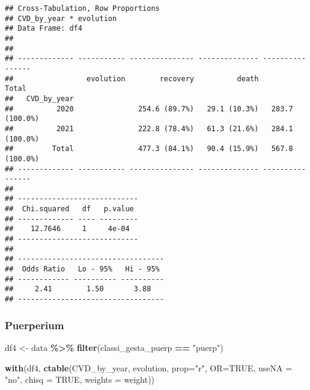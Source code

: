 \documentclass[
]{article}
\newenvironment{Shaded}{\begin{snugshade}}{\end{snugshade}}
\newcommand{\AttributeTok}[1]{\textcolor[rgb]{0.13,0.29,0.53}{#1}}
\newcommand{\ConstantTok}[1]{\textcolor[rgb]{0.56,0.35,0.01}{#1}}
\newcommand{\FunctionTok}[1]{\textcolor[rgb]{0.13,0.29,0.53}{\textbf{#1}}}
\newcommand{\NormalTok}[1]{#1}
\newcommand{\OtherTok}[1]{\textcolor[rgb]{0.56,0.35,0.01}{#1}}
\newcommand{\SpecialCharTok}[1]{\textcolor[rgb]{0.81,0.36,0.00}{\textbf{#1}}}
\newcommand{\StringTok}[1]{\textcolor[rgb]{0.31,0.60,0.02}{#1}}
\begin{document}
\begin{verbatim}
## Cross-Tabulation, Row Proportions  
## CVD_by_year * evolution  
## Data Frame: df4  
## 
## 
## ------------- ----------- --------------- -------------- ----------------
##                 evolution        recovery          death            Total
##   CVD_by_year                                                            
##          2020               254.6 (89.7%)   29.1 (10.3%)   283.7 (100.0%)
##          2021               222.8 (78.4%)   61.3 (21.6%)   284.1 (100.0%)
##         Total               477.3 (84.1%)   90.4 (15.9%)   567.8 (100.0%)
## ------------- ----------- --------------- -------------- ----------------
## 
## ----------------------------
##  Chi.squared   df   p.value 
## ------------- ---- ---------
##    12.7646     1     4e-04  
## ----------------------------
## 
## ----------------------------------
##  Odds Ratio   Lo - 95%   Hi - 95% 
## ------------ ---------- ----------
##     2.41        1.50       3.88   
## ----------------------------------
\end{verbatim}

\hypertarget{puerperium-11}{%
\subsubsection{Puerperium}\label{puerperium-11}}

\begin{Shaded}
\begin{Highlighting}[]
\NormalTok{df4 }\OtherTok{\textless{}{-}}\NormalTok{ data }\SpecialCharTok{\%\textgreater{}\%} 
  \FunctionTok{filter}\NormalTok{(classi\_gesta\_puerp }\SpecialCharTok{==} \StringTok{"puerp"}\NormalTok{)}

\FunctionTok{with}\NormalTok{(df4, }\FunctionTok{ctable}\NormalTok{(CVD\_by\_year, evolution, }\AttributeTok{prop=}\StringTok{"r"}\NormalTok{, }\AttributeTok{OR=}\ConstantTok{TRUE}\NormalTok{, }\AttributeTok{useNA =} \StringTok{"no"}\NormalTok{, }\AttributeTok{chisq =} \ConstantTok{TRUE}\NormalTok{, }\AttributeTok{weights =}\NormalTok{ weight))}
\end{Highlighting}
\end{Shaded}
\end{document}
